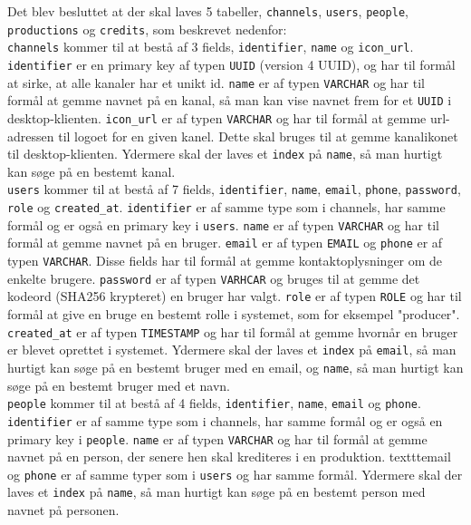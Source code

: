 Det blev besluttet at der skal laves 5 tabeller, \texttt{channels}, \texttt{users}, \texttt{people}, \texttt{productions} og \texttt{credits}, som beskrevet nedenfor:\\


\texttt{channels} kommer til at bestå af 3 fields, \texttt{identifier}, \texttt{name} og \texttt{icon\_url}. \texttt{identifier} er en primary key af typen \texttt{UUID} (version 4 UUID), og har til formål at sirke, at alle kanaler har et unikt id. \texttt{name} er af typen \texttt{VARCHAR} og har til formål at gemme navnet på en kanal, så man kan vise navnet frem for et \texttt{UUID} i desktop-klienten. \texttt{icon\_url} er af typen \texttt{VARCHAR} og har til formål at gemme url-adressen til logoet for en given kanel. Dette skal bruges til at gemme kanalikonet til desktop-klienten. Ydermere skal der laves et \texttt{index} på \texttt{name}, så man hurtigt kan søge på en bestemt kanal.\\


\texttt{users} kommer til at bestå af 7 fields, \texttt{identifier}, \texttt{name}, \texttt{email}, \texttt{phone}, \texttt{password}, \texttt{role} og \texttt{created\_at}. \texttt{identifier} er af samme type som i channels, har samme formål og er også en primary key i \texttt{users}. \texttt{name} er af typen \texttt{VARCHAR} og har til formål at gemme navnet på en bruger. \texttt{email} er af typen \texttt{EMAIL} og \texttt{phone} er af typen \texttt{VARCHAR}. Disse fields har til formål at gemme kontaktoplysninger om de enkelte brugere. \texttt{password} er af typen \texttt{VARHCAR} og bruges til at gemme det kodeord (SHA256 krypteret) en bruger har valgt. \texttt{role} er af typen \texttt{ROLE} og har til formål at give en bruge en bestemt rolle i systemet, som for eksempel "producer". \texttt{created\_at} er af typen \texttt{TIMESTAMP} og har til formål at gemme hvornår en bruger er blevet oprettet i systemet. Ydermere skal der laves et \texttt{index} på \texttt{email}, så man hurtigt kan søge på en bestemt bruger med en email, og \texttt{name}, så man hurtigt kan søge på en bestemt bruger med et navn.\\


\texttt{people} kommer til at bestå af 4 fields, \texttt{identifier}, \texttt{name}, \texttt{email} og \texttt{phone}. \texttt{identifier} er af samme type som i channels, har samme formål og er også en primary key i \texttt{people}. \texttt{name} er af typen \texttt{VARCHAR} og har til formål at gemme navnet på en person, der senere hen skal krediteres i en produktion. texttt{email} og \texttt{phone} er af samme typer som i \texttt{users} og har samme formål. Ydermere skal der laves et \texttt{index} på \texttt{name}, så man hurtigt kan søge på en bestemt person med navnet på personen.\\


